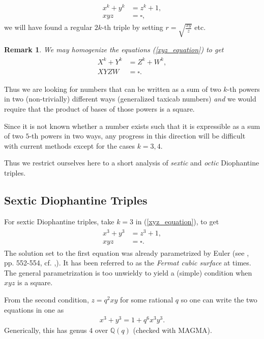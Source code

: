 \documentclass{amsart}
\newtheorem{remark}{Remark}
\begin{document}
\begin{align}
\begin{split} \label{xyz_equation}
    x^k+y^k&=z^k+1,\\
    xyz&=\square,
\end{split}
\end{align}
we will have found a regular $2k$-th triple by setting $r=\sqrt{\frac{xy}{z}}$ etc.
\begin{remark}
    We may homogenize the equations (\ref{xyz_equation}) to get
    \begin{align}
    \begin{split}
        X^k+Y^k&=Z^k+W^k,\\
        XYZW&=\square.
    \end{split}
    \end{align}
\end{remark}
    
Thus we are looking for numbers that can be written as a sum of two $k$-th powers in two (non-trivially) different ways (generalized taxicab numbers) \emph{and} we would require that the product of bases of those powers is a square.

Since it is not known whether a number exists such that it is expressible as a sum of two $5$-th powers in two ways, any progress in this direction will be difficult with current methods except for the cases $k=3,4$.

Thus we restrict ourselves here to a short analysis of \emph{sextic} and \emph{octic} Diophantine triples.

\subsection{Sextic Diophantine Triples}
For sextic Diophantine triples, take $k=3$ in (\ref{xyz_equation}), to get
\begin{align} \label{power-sum cubic} 
\begin{split}
    x^3+y^3&=z^3+1,\\
    xyz&=\square.
\end{split}
\end{align}
The solution set to the first equation was already parametrized by Euler (see \cite{dickson1920history2}, pp. 552-554, cf. \cite{Choudhry},\cite{Elkies_complete_cubic_parametr}).  It has been referred to as the \emph{Fermat cubic surface} at times. 
The general parametrization is too unwieldy to yield a (simple) condition when $xyz$ is a square.

From the second condition, $z=q^2 xy$ for some rational $q$ so one can write the two equations in one as 
\begin{align*}
    x^3+y^3=1+q^6 x^3 y^3.
\end{align*}
Generically, this has genus $4$ over $\mathbb{Q}(q)$ (checked with MAGMA).
\end{document}
